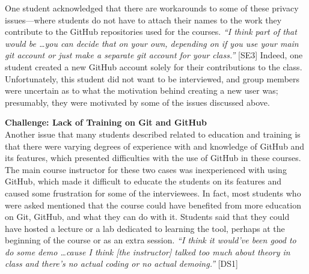 One student acknowledged that there are workarounds to some of these privacy issues---where students do not have to attach their names to the work they contribute to the GitHub repositories used for the courses. \textit{``I think part of that would be \ldots you can decide that on your own, depending on if you use your main git account or just make a separate git account for your class.''} [SE3] Indeed, one student created a new GitHub account solely for their contributions to the class. Unfortunately, this student did not want to be interviewed, and group members were uncertain as to what the motivation behind creating a new user was; presumably, they were motivated by some of the issues discussed above.


\textbf{Challenge: Lack of Training on Git and GitHub} \\

Another issue that many students described related to education and training is that there were varying degrees of experience with and knowledge of GitHub and its features, which presented difficulties with the use of GitHub in these courses. The main course instructor for these two cases was inexperienced with using GitHub, which made it difficult to educate the students on its features and caused some frustration for some of the interviewees. In fact, most students who were asked mentioned that the course could have benefited from more education on Git, GitHub, and what they can do with it. Students said that they could have hosted a lecture or a lab dedicated to learning the tool, perhaps at the beginning of the course or as an extra session. \textit{``I think it would've been good to do some demo \ldots cause I think [the instructor] talked too much about theory in class and there's no actual coding or no actual demoing.''} [DS1]

